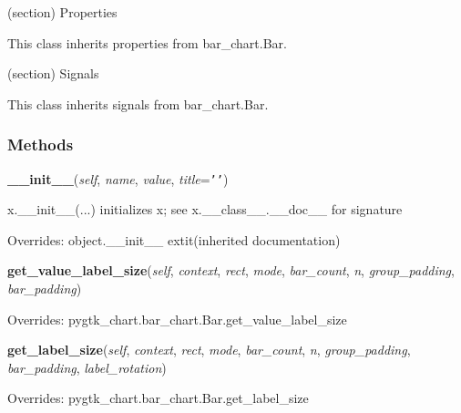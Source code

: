(section) Properties

  This class inherits properties from bar\_chart.Bar.

(section) Signals

  This class inherits signals from bar\_chart.Bar.



  \subsubsection{Methods}

    \vspace{0.5ex}

\hspace{.8\funcindent}\begin{boxedminipage}{\funcwidth}

    \raggedright \textbf{\_\_init\_\_}(\textit{self}, \textit{name}, \textit{value}, \textit{title}={\tt \texttt{'}\texttt{}\texttt{'}})

\setlength{\parskip}{2ex}
    x.\_\_init\_\_(...) initializes x; see x.\_\_class\_\_.\_\_doc\_\_ for 
    signature

\setlength{\parskip}{1ex}
      Overrides: object.\_\_init\_\_ 	extit{(inherited documentation)}

    \end{boxedminipage}

    \vspace{0.5ex}

\hspace{.8\funcindent}\begin{boxedminipage}{\funcwidth}

    \raggedright \textbf{get\_value\_label\_size}(\textit{self}, \textit{context}, \textit{rect}, \textit{mode}, \textit{bar\_count}, \textit{n}, \textit{group\_padding}, \textit{bar\_padding})

\setlength{\parskip}{2ex}
\setlength{\parskip}{1ex}
      Overrides: pygtk\_chart.bar\_chart.Bar.get\_value\_label\_size

    \end{boxedminipage}

    \vspace{0.5ex}

\hspace{.8\funcindent}\begin{boxedminipage}{\funcwidth}

    \raggedright \textbf{get\_label\_size}(\textit{self}, \textit{context}, \textit{rect}, \textit{mode}, \textit{bar\_count}, \textit{n}, \textit{group\_padding}, \textit{bar\_padding}, \textit{label\_rotation})

\setlength{\parskip}{2ex}
\setlength{\parskip}{1ex}
      Overrides: pygtk\_chart.bar\_chart.Bar.get\_label\_size

    \end{boxedminipage}



